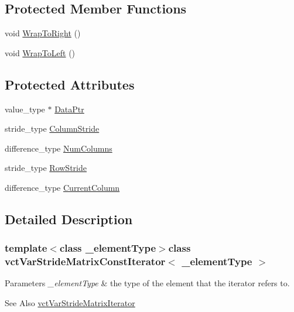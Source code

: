 \subsection*{Protected Member Functions}
\begin{DoxyCompactItemize}
\item 
void \hyperlink{classvct_var_stride_matrix_const_iterator_a55c69c6091a5bb187fde4f8be9f6a556}{Wrap\-To\-Right} ()
\item 
void \hyperlink{classvct_var_stride_matrix_const_iterator_a65882b2527bba75fdecda49476c56a1b}{Wrap\-To\-Left} ()
\end{DoxyCompactItemize}
\subsection*{Protected Attributes}
\begin{DoxyCompactItemize}
\item 
value\-\_\-type $\ast$ \hyperlink{classvct_var_stride_matrix_const_iterator_a37082ec0e45ee9d5be0b904b5bc81bb2}{Data\-Ptr}
\item 
stride\-\_\-type \hyperlink{classvct_var_stride_matrix_const_iterator_ab98d9434efbc9e7134de2fcec000a3d8}{Column\-Stride}
\item 
difference\-\_\-type \hyperlink{classvct_var_stride_matrix_const_iterator_acbbccea49ba03c2c413bffe4bb5bfa7f}{Num\-Columns}
\item 
stride\-\_\-type \hyperlink{classvct_var_stride_matrix_const_iterator_a404ec3349c14282af252a00d3b9a6290}{Row\-Stride}
\item 
difference\-\_\-type \hyperlink{classvct_var_stride_matrix_const_iterator_ab4a96221a2fbcc7005f464c24af72b5b}{Current\-Column}
\end{DoxyCompactItemize}


\subsection{Detailed Description}
\subsubsection*{template$<$class \-\_\-element\-Type$>$class vct\-Var\-Stride\-Matrix\-Const\-Iterator$<$ \-\_\-element\-Type $>$}


\begin{DoxyParams}{Parameters}
{\em \-\_\-element\-Type} & the type of the element that the iterator refers to.\\
\hline
\end{DoxyParams}
\begin{DoxySeeAlso}{See Also}
\hyperlink{classvct_var_stride_matrix_iterator}{vct\-Var\-Stride\-Matrix\-Iterator} 
\end{DoxySeeAlso}


